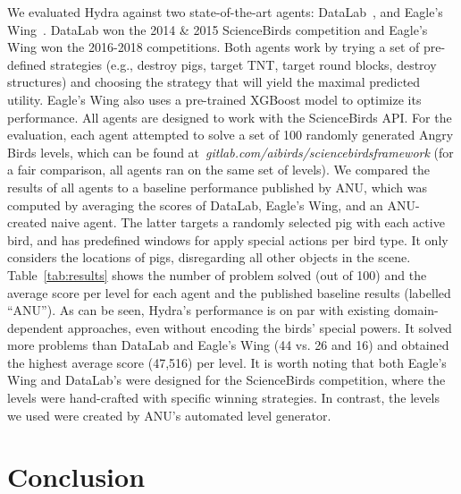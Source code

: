 \documentclass[letterpaper]{article}
\begin{document}
We evaluated Hydra against two state-of-the-art agents:
DataLab~\cite{borovicka2014datalab}, and
Eagle's Wing~\cite{wang2017description}.
DataLab won the 2014 \& 2015 ScienceBirds competition and Eagle's Wing won the 2016-2018 competitions.
Both agents work by trying a set of pre-defined strategies (e.g., destroy pigs, target TNT, target round blocks, destroy structures) and choosing the strategy that will yield the maximal predicted utility.
Eagle's Wing also uses a pre-trained XGBoost model to optimize its performance. %
All agents are designed to work with the ScienceBirds API. For the evaluation, each agent attempted to solve a set of 100 randomly generated Angry Birds levels, which can be found at~\emph{gitlab.com/aibirds/sciencebirdsframework} (for a fair comparison, all agents ran on the same set of levels).
We compared the results of all agents to a baseline performance published by ANU, which was computed by averaging the scores of
DataLab,
Eagle's Wing,
and an ANU-created naive agent.
The latter targets a randomly selected pig with each active bird, and has predefined windows for apply special actions per bird type. It only considers the locations of pigs, disregarding all other objects in the scene.  Table~\ref{tab:results} shows the number of problem solved (out of 100) and the average score per level for each agent and the published baseline results (labelled ``ANU'').
As can be seen, Hydra's performance is on par with existing domain-dependent approaches, even without encoding the birds' special powers. It solved more problems than DataLab and Eagle's Wing (44 vs. 26 and 16) and obtained the highest average score (47,516) per level.
It is worth noting that both Eagle's Wing and DataLab's were designed for the ScienceBirds competition, where the levels were hand-crafted with specific winning strategies. In contrast, the levels we used were created by ANU's automated level generator.

















\section{Conclusion}
\end{document}
